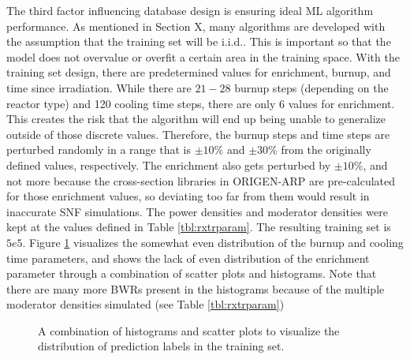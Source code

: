  The third factor influencing database
design is ensuring ideal \gls{ML} algorithm performance.  As mentioned in
Section X, many algorithms are developed with the assumption that the training
set will be \acrfull{i.i.d.}.  This is important so that the model does not
overvalue or overfit a certain area in the training space. With the training
set design, there are predetermined values for enrichment, burnup, and time
since irradiation.  While there are $21-28$ burnup steps (depending on the
reactor type) and 120 cooling time steps, there are only 6 values for
enrichment. This creates the risk that the algorithm will end up being unable
to generalize outside of those discrete values. Therefore, the burnup steps and
time steps are perturbed randomly in a range that is $\pm10\%$ and $\pm30\%$
from the originally defined values, respectively.  The enrichment also gets
perturbed by $\pm10\%$, and not more because the cross-section libraries in
\gls{ORIGEN-ARP} are pre-calculated for those enrichment values, so deviating
too far from them would result in inaccurate \gls{SNF} simulations. The power
densities and moderator densities were kept at the values defined in Table
\ref{tbl:rxtrparam}.  The resulting training set is $5e5$.  Figure
\ref{fig:trainhist} visualizes the somewhat even distribution of the burnup and
cooling time parameters, and shows the lack of even distribution of the
enrichment parameter through a combination of scatter plots and histograms.
Note that there are many more \gls{BWR}s present in the histograms because of
the multiple moderator densities simulated (see Table \ref{tbl:rxtrparam})

\begin{figure}[!htb]
  \caption{A combination of histograms and scatter plots to visualize the 
           distribution of prediction labels in the training set.}
  \label{fig:trainhist}
\end{figure}

